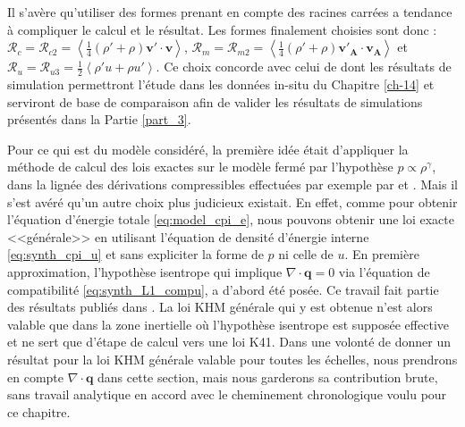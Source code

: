 Il s'avère qu'utiliser des formes prenant en compte des racines carrées a tendance à compliquer le calcul et le résultat. Les formes finalement choisies sont donc : $\mathcal{R}_{c} = \mathcal{R}_{c2} = \left<\frac{1}{4} \left(\rho'+\rho\right) \boldsymbol{v'} \cdot  \boldsymbol{v} \right>$, $\mathcal{R}_{m} = \mathcal{R}_{m2} = \left<\frac{1}{4} \left(\rho'+\rho\right) \boldsymbol{v'_A} \cdot  \boldsymbol{v_A} \right>$ et $\mathcal{R}_{u} = \mathcal{R}_{u3} = \frac{1}{2}\left< \rho' u + \rho u'\right> $. Ce choix concorde avec celui de \cite{andres_energy_2018} dont les résultats de simulation permettront l'étude dans les données in-situ du Chapitre \ref{ch-14} et serviront de base de comparaison afin de valider les résultats de simulations présentés dans la Partie \ref{part_3}.

Pour ce qui est du modèle considéré, la première idée était d'appliquer la méthode de calcul des lois exactes sur le modèle fermé par l'hypothèse $p \propto \rho^{\gamma}$, dans la lignée des dérivations compressibles effectuées par exemple par \cite{galtier_exact_2011} et \cite{andres_alternative_2017}. Mais il s'est avéré qu'un autre choix plus judicieux existait. En effet, comme pour obtenir l'équation d'énergie totale \eqref{eq:model_cpi_e}, nous pouvons obtenir une loi exacte <<générale>> en utilisant l'équation de densité d'énergie interne \eqref{eq:synth_cpi_u} et sans expliciter la forme de $p$ ni celle de $u$. En première approximation, l'hypothèse isentrope qui implique $\nabla \cdot \boldsymbol{q} = 0$ via l'équation de compatibilité \eqref{eq:synth_L1_compu}, a d'abord été posée. Ce travail fait partie des résultats publiés dans \cite{simon_general_2021}. La loi \acs{KHM} générale qui y est obtenue n'est alors valable que dans la zone inertielle où l'hypothèse isentrope est supposée effective et ne sert que d'étape de calcul vers une loi \acs{K41}. Dans une volonté de donner un résultat pour la loi \acs{KHM} générale valable pour toutes les échelles, nous prendrons en compte $\nabla \cdot \boldsymbol{q}$ dans cette section, mais nous garderons sa contribution brute, sans travail analytique en accord avec le cheminement chronologique voulu pour ce chapitre. 

